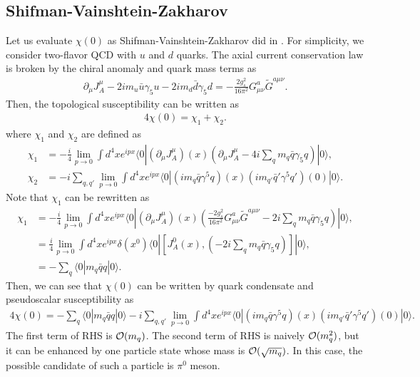 \documentclass[11pt,a4paper]{article}
\begin{document}
\subsection{Shifman-Vainshtein-Zakharov}
Let us evaluate $\chi(0)$ as Shifman-Vainshtein-Zakharov did in \cite{Shifman:1979if}. For simplicity, we consider two-flavor QCD with $u$ and $d$ quarks.
The axial current conservation law is broken by the chiral anomaly and quark mass terms as
\begin{align}
    \partial_\mu J_A^\mu - 2i m_u \bar u \gamma_5 u - 2i m_d \bar d \gamma_5 d = -\frac{2 g_s^2}{16\pi^2} G_{\mu\nu}^a \tilde G^{a\mu\nu}.
\end{align}
Then, the topological susceptibility can be written as
\begin{align}
    4 \chi(0) = \chi_1 + \chi_2.
\end{align}
where $\chi_1$ and $\chi_2$ are defined as
\begin{align}
    \chi_1 &= -\frac{i}{4} \lim_{p\to 0} \int d^4 x e^{ipx} \langle 0 | (\partial_\mu J_A^\mu)(x) \left( \partial_\mu J_A^\mu - 4i \sum_q m_q \bar q \gamma_5 q\right) |0\rangle, \\
    \chi_2 &= -i\sum_{q,q'} \lim_{p\to 0} \int d^4 x e^{ipx} \langle 0 | \left( im_q \bar q \gamma^5 q \right)(x) \left( im_{q'} \bar q' \gamma^5 q' \right)(0) |0\rangle.
\end{align}
Note that $\chi_1$ can be rewritten as
\begin{align}
    \chi_1 &= -\frac{i}{4} \lim_{p\to 0} \int d^4 x e^{ipx} \langle 0 | (\partial_\mu J_A^\mu)(x) \left( \frac{-2g_s^2}{16\pi^2} G_{\mu\nu}^a \tilde G^{a\mu\nu} - 2i \sum_q m_q \bar q \gamma_5 q\right) |0\rangle, \nonumber\\
    &= \frac{i}{4} \lim_{p\to 0} \int d^4 x e^{ipx} \delta(x^0) \langle 0 | \left[ J_A^0(x), \left(  - 2i \sum_q m_q \bar q \gamma_5 q\right) \right] |0\rangle, \\
    &= -\sum_q \langle 0| m_q \bar q q |0 \rangle.
\end{align}
Then, we can see that $\chi(0)$ can be written by quark condensate and pseudoscalar susceptibility as
\cite{Crewther:1977ce, Crewther:1978kq, Veneziano:1980xs}
\begin{align}
    4 \chi(0) = -\sum_q \langle 0| m_q \bar q q |0\rangle -i \sum_{q,q'} \lim_{p\to 0} \int d^4 x e^{ipx} \langle 0 | \left( im_q \bar q \gamma^5 q \right)(x) \left( im_{q'} \bar q' \gamma^5 q' \right)(0) |0\rangle. \label{eq:chi by qqbar and pseudoscalar susceptibility}
\end{align}
The first term of RHS is ${\cal O}(m_q)$. The second term of RHS is naively ${\cal O}(m_q^2)$, but it can be enhanced by one particle state whose mass is ${\cal O}(\sqrt{m_q})$. In this case, the possible candidate of such a particle is $\pi^0$ meson.
\end{document}
